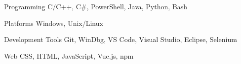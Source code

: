 
\begin{cvskills}

  \cvskill
    {Programming} %
    {C/C++, C\#, PowerShell, Java, Python, Bash} %

  \cvskill
    {Platforms} %
    {Windows, Unix/Linux} %

  \cvskill
    {Development Tools} %
    {Git, WinDbg, VS Code, Visual Studio, Eclipse, Selenium} %

  \cvskill
    {Web} %
    {CSS, HTML, JavaScript, Vue.js, npm} %

\end{cvskills}
